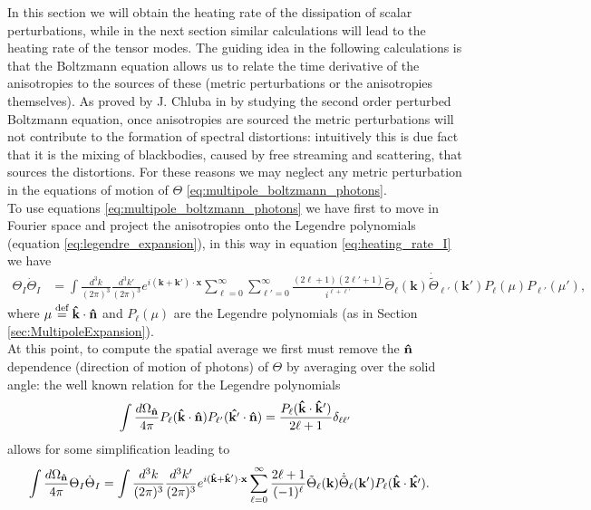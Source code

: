 In this section we will obtain the heating rate of the dissipation of scalar perturbations, while in the next section similar calculations will lead to the heating rate of the tensor modes. The guiding idea in the following calculations is that the Boltzmann equation allows us to relate the time derivative of the anisotropies to the sources of these (metric perturbations or the anisotropies themselves). As proved by J. Chluba in \cite{Chluba_2x2} by studying the second order perturbed Boltzmann equation, once anisotropies are sourced the metric perturbations will not contribute to the formation of spectral distortions: intuitively this is due fact that it is the mixing of blackbodies, caused by free streaming and scattering, that sources the distortions. For these reasons we may neglect any metric perturbation in the equations of motion of $\Theta$ \eqref{eq:multipole_boltzmann_photons}.\\ To use equations \eqref{eq:multipole_boltzmann_photons} we have first to move in Fourier space and project the anisotropies onto the Legendre polynomials (equation \eqref{eq:legendre_expansion}), in this way in equation \eqref{eq:heating_rate_I} we have
\begin{align*}
    \Theta_I\dot \Theta_I&=\int\frac{d^3k}{(2\pi)^3}\frac{d^3k'}{(2\pi)^3}e^{i(\mathbf{k}+\mathbf{k}')\cdot\mathbf{x}}\sum_{\ell=0}^{\infty}\sum_{\ell'=0}^{\infty}\frac{(2\ell+1)(2\ell'+1)}{i^{\ell+\ell'}}\tilde\Theta_\ell(\mathbf{k})\dot{\tilde\Theta}_{\ell'}(\mathbf{k}')P_\ell(\mu)P_{\ell'}(\mu'),
\end{align*}
where $\mu\stackrel{\text{def}}{=}\mathbf{\hat{k}}\cdot\mathbf{\hat{n}}$ and $P_\ell(\mu)$ are the Legendre polynomials (as in Section \ref{sec:MultipoleExpansion}). \\
At this point, to compute the spatial average we first must remove the $\mathbf{\hat{n}}$ dependence (direction of motion of photons) of $\Theta$ by averaging over the solid angle: the well known relation for the Legendre polynomials
$$\int\frac{d\Omega_{\mathbf{\hat{n}}}}{4\pi} P_\ell(\mathbf{\hat{k}}\cdot\mathbf{\hat{n}})P_{\ell'}(\mathbf{\hat{k'}}\cdot\mathbf{\hat{n}})=\frac{P_\ell(\mathbf{\hat{k}}\cdot\mathbf{\hat{k}}')}{2\ell+1}\delta_{\ell\ell'}$$
allows for some simplification leading to 
\begin{align*}
    \int\frac{d\Omega_{\mathbf{\hat{n}}}}{4\pi}\Theta_I\dot \Theta_I&=\int\frac{d^3k}{(2\pi)^3}\frac{d^3k'}{(2\pi)^3}e^{i(\mathbf{\hat{k}}+\mathbf{\hat{k}}')\cdot\mathbf{x}}\sum_{\ell=0}^{\infty}\frac{2\ell+1}{(-1)^{\ell}}\tilde\Theta_\ell(\mathbf{k})\dot{\tilde\Theta}_{\ell}(\mathbf{k}')P_\ell(\mathbf{\hat{k}}\cdot\mathbf{\hat{k'}}).
\end{align*}
